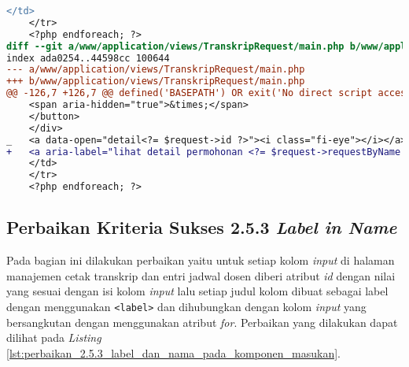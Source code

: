 \begin{lstlisting}[frame=single, label={lst:perbaikan_2.4.4_tautan_tanpa_keterangan}, language=diff, caption=Perbaikan Kriteria Sukses 2.4.4]
    </td>
    </tr>
    <?php endforeach; ?>
diff --git a/www/application/views/TranskripRequest/main.php b/www/application/views/TranskripRequest/main.php
index ada0254..44598cc 100644
--- a/www/application/views/TranskripRequest/main.php
+++ b/www/application/views/TranskripRequest/main.php
@@ -126,7 +126,7 @@ defined('BASEPATH') OR exit('No direct script access allowed');
    <span aria-hidden="true">&times;</span>
    </button>
    </div>
_   <a data-open="detail<?= $request->id ?>"><i class="fi-eye"></i></a>
+   <a aria-label="lihat detail permohonan <?= $request->requestByName ?>" data-open="detail<?= $request->id ?>"><i class="fi-eye"></i></a>
    </td>
    </tr>
    <?php endforeach; ?>
\end{lstlisting}

\subsection{Perbaikan Kriteria Sukses 2.5.3 \textit{Label in Name}}
\label{subsec:perbaikan_kriteria_sukses_2.5.3}
Pada bagian ini dilakukan perbaikan yaitu untuk setiap kolom \textit{input} di halaman manajemen cetak transkrip dan entri jadwal dosen diberi atribut \textit{id} dengan nilai yang sesuai dengan isi kolom \textit{input} lalu setiap judul kolom dibuat sebagai label dengan menggunakan \texttt{<label>} dan dihubungkan dengan kolom \textit{input} yang bersangkutan dengan menggunakan atribut \textit{for}. Perbaikan yang dilakukan dapat dilihat pada \textit{Listing} \ref{lst:perbaikan_2.5.3_label_dan_nama_pada_komponen_masukan}.

